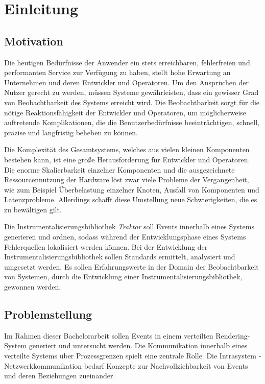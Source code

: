 %

\chapter{Einleitung}
\label{chapter:Einleitung}


\section{Motivation}
\label{section:Motivation}
	Die heutigen Bedürfnisse der Anwender ein stets erreichbaren, fehlerfreien und performanten Service zur Verfügung zu haben, stellt hohe Erwartung an Unternehmen und deren Entwickler und Operatoren. Um den Ansprüchen der Nutzer gerecht zu werden, müssen Systeme gewährleisten, dass ein gewisser Grad von Beobachtbarkeit des Systems erreicht wird. Die Beobachtbarkeit sorgt für die nötige Reaktionsfähigkeit der Entwickler und Operatoren, um möglicherweise auftretende Komplikationen, die die  Benutzerbedürfnisse beeinträchtigen, schnell, präzise und langfristig beheben zu können.
	
	Die Komplexität des Gesamtsystems, welches aus vielen kleinen Komponenten bestehen kann, ist eine große Herausforderung für Entwickler und Operatoren. Die enorme Skalierbarkeit einzelner Komponenten und die ausgezeichnete Ressourcennutzung der Hardware löst zwar viele Probleme der Vergangenheit, wie zum Beispiel Überbelastung einzelner Knoten, Ausfall von Komponenten und Latenzprobleme. Allerdings schafft diese Umstellung neue Schwierigkeiten, die es zu bewältigen gilt. 
	
	Die Instrumentalisierungsbibliothek \emph{Traktor} soll Events innerhalb eines Systems generieren und ordnen, sodass während der Entwicklungsphase eines Systems Fehlerquellen lokalisiert werden können. Bei der Entwicklung der Instrumentalisierungsbibliothek sollen Standards ermittelt, analysiert und umgesetzt werden. Es sollen Erfahrungswerte in der Domain der Beobachtbarkeit von Systemen, durch die Entwicklung einer Instrumentalisierungsbibliothek, gewonnen werden.
	
\section{Problemstellung}
\label{section:Problemstellung}
	Im Rahmen dieser Bachelorarbeit sollen Events in einem verteilten Rendering-System generiert und untersucht werden. Die Kommunikation innerhalb eines verteilte Systems über Prozessgrenzen spielt eine zentrale Rolle.
	Die Intrasystem - Netzwerkkommunikation bedarf Konzepte zur Nachvollziehbarkeit von Events und deren Beziehungen zueinander. 
	

